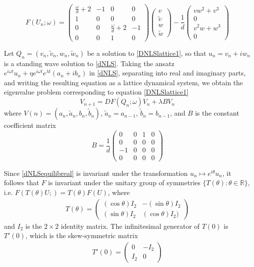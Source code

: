 \documentclass[12pt]{article}
\def\R{{\mathbb R}}
\begin{document}
\begin{equation}\label{FdNLS}
F(U_n; \omega) =
\begin{pmatrix}
\frac{\omega}{d} + 2 & -1 & 0 & 0 \\
1 & 0 & 0 & 0 \\
0 & 0 & \frac{\omega}{d} + 2 & -1 \\
0 & 0 & 1 & 0
\end{pmatrix}
\begin{pmatrix}
v \\ \tilde{v} \\ w \\ \tilde{w}
\end{pmatrix}
- \frac{1}{d} 
\begin{pmatrix}
v w^2 + v^3 \\ 0 \\ v^2 w + w^3 \\ 0
\end{pmatrix}
\end{equation}

Let $Q_n = (v_n, \tilde{v}_n, w_n, \tilde{w}_n)$ be a solution to \eqref{DNLSlattice1}, so that $u_n = v_n + i w_n$ is a standing wave solution to \eqref{dNLS}. Taking the ansatz $e^{i\omega t} u_n + \eta e^{i\omega t} e^{\lambda t} (a_n + i b_n)$ in \eqref{dNLS}, separating into real and imaginary parts, and writing the resulting equation as a lattice dynamical system, we obtain the eigenvalue problem corresponding to equation \eqref{DNLSlattice1}
\begin{equation}\label{dNLSlatticeEVP}
V_{n+1} = DF(Q_n; \omega) V_n + \lambda B V_n
\end{equation}
where $V(n) = (a_n, \tilde{a}_n, b_n, \tilde{b}_n)$, $\tilde{a}_n = a_{n-1}$, $\tilde{b}_n = b_{n-1}$, and $B$ is the constant coefficient matrix 
\begin{equation}\label{dNLSB}
B = \frac{1}{d}
\begin{pmatrix}
0 & 0 & 1 & 0 \\
0 & 0 & 0 & 0 \\
-1 & 0 & 0 & 0 \\
0 & 0 & 0 & 0
\end{pmatrix}
\end{equation}

Since \eqref{dNLSequilibreal} is invariant under the transformation $u_n \mapsto e^{i \theta}u_n$, it follows that $F$ is invariant under the unitary group of symmetries $\{T(\theta) : \theta \in \R\}$, i.e. $F(T(\theta)U; ) = T(\theta)F(U)$, where
\begin{align}\label{TdNLS}
T(\theta) =
\begin{pmatrix}
(\cos\theta) I_2 & -(\sin\theta)I_2 \\
(\sin\theta)I_2 & (\cos\theta)I_2)
\end{pmatrix}
\end{align}
and $I_2$ is the $2 \times 2$ identity matrix. The infinitesimal generator of $T(0)$ is $T'(0)$, which is the skew-symmetric matrix
\begin{align}\label{dnlsSgen}
T'(0) = \begin{pmatrix}
0 & -I_2 \\
I_2 & 0
\end{pmatrix}
\end{align}
\end{document}
